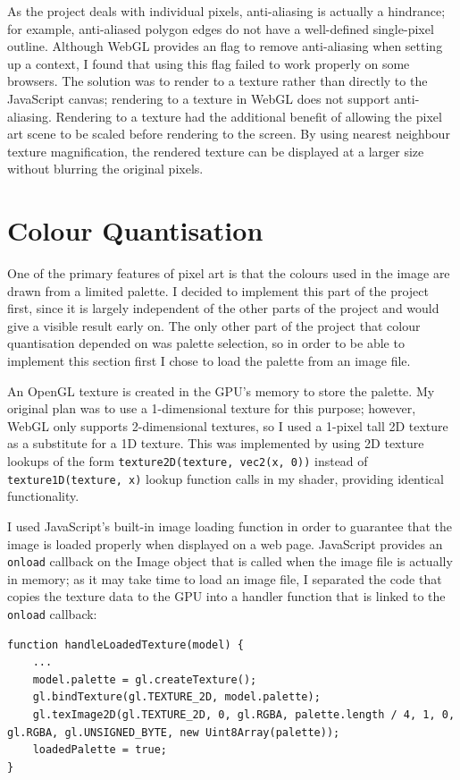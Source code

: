 \documentclass[12pt,twoside,notitlepage]{report}
\begin{document}
As the project deals with individual pixels, anti-aliasing is actually a hindrance; for example, anti-aliased polygon edges do not have a well-defined single-pixel outline. Although WebGL provides an flag to remove anti-aliasing when setting up a context, I found that using this flag failed to work properly on some browsers. The solution was to render to a texture rather than directly to the JavaScript canvas; rendering to a texture in WebGL does not support anti-aliasing. Rendering to a texture had the additional benefit of allowing the pixel art scene to be scaled before rendering to the screen. By using nearest neighbour texture magnification, the rendered texture can be displayed at a larger size without blurring the original pixels.

\section{Colour Quantisation}

One of the primary features of pixel art is that the colours used in the image are drawn from a limited palette. I decided to implement this part of the project first, since it is largely independent of the other parts of the project and would give a visible result early on. The only other part of the project that colour quantisation depended on was palette selection, so in order to be able to implement this section first I chose to load the palette from an image file.

An OpenGL texture is created in the GPU's memory to store the palette. My original plan was to use a 1-dimensional texture for this purpose; however, WebGL only supports 2-dimensional textures, so I used a 1-pixel tall 2D texture as a substitute for a 1D texture. This was implemented by using 2D texture lookups of the form \verb|texture2D(texture, vec2(x, 0))| instead of \verb|texture1D(texture, x)| lookup function calls in my shader, providing identical functionality.

I used JavaScript's built-in image loading function in order to guarantee that the image is loaded properly when displayed on a web page. JavaScript provides an \verb|onload| callback on the Image object that is called when the image file is actually in memory; as it may take time to load an image file, I separated the code that copies the texture data to the GPU into a handler function that is linked to the \verb|onload| callback:

\newpage

\begin{lstlisting}[caption = Texture loaded callback]
function handleLoadedTexture(model) {
	...
	model.palette = gl.createTexture();
	gl.bindTexture(gl.TEXTURE_2D, model.palette);
	gl.texImage2D(gl.TEXTURE_2D, 0, gl.RGBA, palette.length / 4, 1, 0, gl.RGBA, gl.UNSIGNED_BYTE, new Uint8Array(palette));
	loadedPalette = true;
}
\end{lstlisting}
\end{document}
